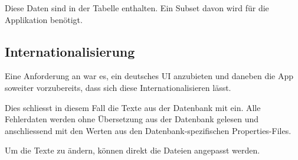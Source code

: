 Diese Daten sind in der Tabelle  enthalten.
Ein Subset davon wird für die Applikation benötigt.

\subsection{Internationalisierung}
\label{datenquellen-internationalisierung}
Eine Anforderung an \kort war es, ein deutsches UI anzubieten und daneben die App soweiter vorzubereits, dass sich diese Internationalisieren lässt.

Dies schliesst in diesem Fall die Texte aus der Datenbank mit ein.
Alle Fehlerdaten werden ohne Übersetzung aus der Datenbank gelesen und anschliessend mit den Werten aus den Datenbank-spezifischen Properties-Files.

Um die Texte zu ändern, können direkt die Dateien angepasst werden.